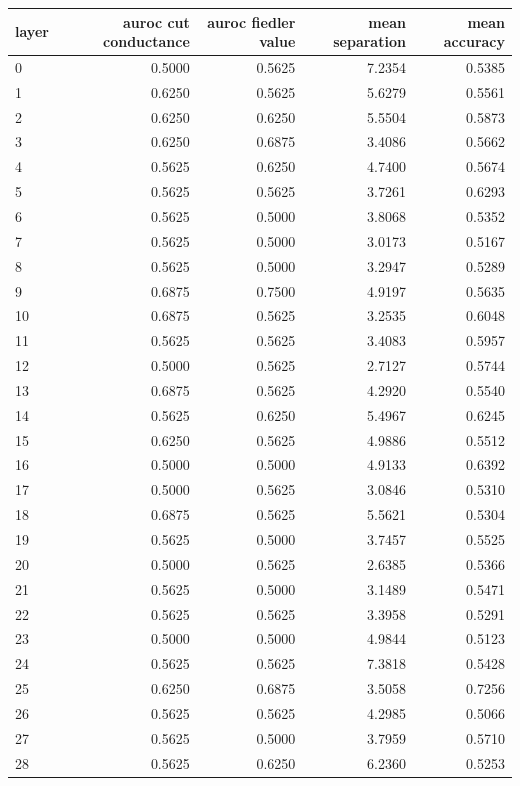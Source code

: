 \documentclass[11pt,a4paper]{article}
\begin{document}
\begin{table}[htbp]
\centering
\small
\begin{tabular}{lrrrr}
\hline
layer & auroc cut conductance & auroc fiedler value & mean separation & mean accuracy \\
\hline
0 & 0.5000 & 0.5625 & 7.2354 & 0.5385 \\
1 & 0.6250 & 0.5625 & 5.6279 & 0.5561 \\
2 & 0.6250 & 0.6250 & 5.5504 & 0.5873 \\
3 & 0.6250 & 0.6875 & 3.4086 & 0.5662 \\
4 & 0.5625 & 0.6250 & 4.7400 & 0.5674 \\
5 & 0.5625 & 0.5625 & 3.7261 & 0.6293 \\
6 & 0.5625 & 0.5000 & 3.8068 & 0.5352 \\
7 & 0.5625 & 0.5000 & 3.0173 & 0.5167 \\
8 & 0.5625 & 0.5000 & 3.2947 & 0.5289 \\
9 & 0.6875 & 0.7500 & 4.9197 & 0.5635 \\
10 & 0.6875 & 0.5625 & 3.2535 & 0.6048 \\
11 & 0.5625 & 0.5625 & 3.4083 & 0.5957 \\
12 & 0.5000 & 0.5625 & 2.7127 & 0.5744 \\
13 & 0.6875 & 0.5625 & 4.2920 & 0.5540 \\
14 & 0.5625 & 0.6250 & 5.4967 & 0.6245 \\
15 & 0.6250 & 0.5625 & 4.9886 & 0.5512 \\
16 & 0.5000 & 0.5000 & 4.9133 & 0.6392 \\
17 & 0.5000 & 0.5625 & 3.0846 & 0.5310 \\
18 & 0.6875 & 0.5625 & 5.5621 & 0.5304 \\
19 & 0.5625 & 0.5000 & 3.7457 & 0.5525 \\
20 & 0.5000 & 0.5625 & 2.6385 & 0.5366 \\
21 & 0.5625 & 0.5000 & 3.1489 & 0.5471 \\
22 & 0.5625 & 0.5625 & 3.3958 & 0.5291 \\
23 & 0.5000 & 0.5000 & 4.9844 & 0.5123 \\
24 & 0.5625 & 0.5625 & 7.3818 & 0.5428 \\
25 & 0.6250 & 0.6875 & 3.5058 & 0.7256 \\
26 & 0.5625 & 0.5625 & 4.2985 & 0.5066 \\
27 & 0.5625 & 0.5000 & 3.7959 & 0.5710 \\
28 & 0.5625 & 0.6250 & 6.2360 & 0.5253 \\

\end{tabular}
\end{table}
\end{document}
